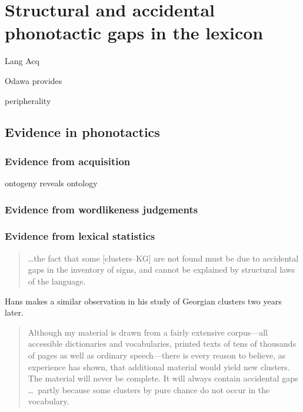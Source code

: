 \chapter{Structural and accidental phonotactic gaps in the lexicon}

\citet[][111]{Vennemann1972}
\citet[][94f.]{Shibatani1973}
\citet[][84]{Hooper1973}
\citet{Kaye1974}
\citet{Clayton1976}


Lang Acq

\citet{White2008}


Odawa provides 

peripherality
\citet[][8f.]{LGB}
\citep{Duanmu2008}
\citet{Borowsky1989} 

\section{Evidence in phonotactics}

\subsection{Evidence from acquisition}

ontogeny reveals ontology



\subsection{Evidence from wordlikeness judgements}


\subsection{Evidence from lexical statistics}

\citet{Berkley1994a,Berkley1994b}

\begin{quotation}
\ldots the fact that some [clusters--KG] are not found must be due to accidental gaps in the inventory of signs, and cannot be explained by structural laws of the language. \citep[][]{Fischer-Jorgensen1952}
\end{quotation}

Hans \citeauthor{Vogt1954} makes a similar observation in his study of Georgian clusters two years later.

\begin{quotation}
Although my material is drawn from a fairly extensive corpus---all accessible dictionaries and vocabularies, printed texts of tens of thousands of pages as well as ordinary speech---there is every reason to believe, as experience has shown, that additional material would yield new clusters. The material will never be complete. It will always contain accidental gaps \ldots~partly because some clusters by pure chance do not occur in the vocabulary. \citep[][30]{Vogt1954}
\end{quotation}

